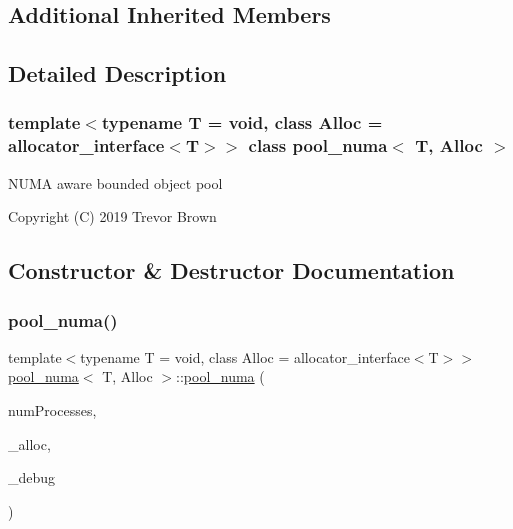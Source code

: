 \subsection*{Additional Inherited Members}


\subsection{Detailed Description}
\subsubsection*{template$<$typename T = void, class Alloc = allocator\+\_\+interface$<$\+T$>$$>$\newline
class pool\+\_\+numa$<$ T, Alloc $>$}

N\+U\+MA aware bounded object pool

Copyright (C) 2019 Trevor Brown 

\subsection{Constructor \& Destructor Documentation}
\mbox{\label{classpool__numa_aaa2884448972f582e0f9428027a35d97}} 
\subsubsection{\texorpdfstring{pool\+\_\+numa()}{pool\_numa()}}
{\footnotesize\ttfamily template$<$typename T  = void, class Alloc  = allocator\+\_\+interface$<$\+T$>$$>$ \\
\hyperlink{classpool__numa}{pool\+\_\+numa}$<$ T, Alloc $>$\+::\hyperlink{classpool__numa}{pool\+\_\+numa} (\begin{DoxyParamCaption}\item[{const int}]{num\+Processes,  }\item[{Alloc $\ast$const}]{\+\_\+alloc,  }\item[{\hyperlink{classdebugInfo}{debug\+Info} $\ast$const}]{\+\_\+debug }\end{DoxyParamCaption})\hspace{0.3cm}{\ttfamily [inline]}}

\mbox{\label{classpool__numa_a8e29fd88094bb876fcb02a59f6dd0f0a}} 

